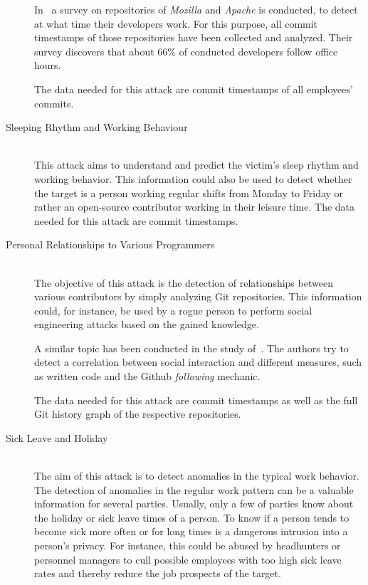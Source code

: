 \begin{description}
        In~\cite{article:do-programmers-work-at-night} a survey on repositories of \emph{Mozilla} and \emph{Apache} is conducted, to detect at what time their developers work.
        For this purpose, all commit timestamps of those repositories have been collected and analyzed.
        Their survey discovers that about 66\% of conducted developers follow office hours.

        The data needed for this attack are commit timestamps of all employees' commits.

    \item[Sleeping Rhythm and Working Behaviour] \hfill \\
        This attack aims to understand and predict the victim's sleep rhythm and working behavior.
        This information could also be used to detect whether the target is a person working regular shifts from Monday to Friday or rather an open-source contributor working in their leisure time.
        The data needed for this attack are commit timestamps.

    \item[Personal Relationships to Various Programmers] \hfill \\
        The objective of this attack is the detection of relationships between various contributors by simply analyzing Git repositories.
        This information could, for instance, be used by a rogue person to perform social engineering attacks based on the gained knowledge.

        A similar topic has been conducted in the study of~\cite{inproceedings:exploring-the-ecosystem}.
        The authors try to detect a correlation between social interaction and different measures, such as written code and the Github \emph{following} mechanic.

        The data needed for this attack are commit timestamps as well as the full Git history graph of the respective repositories.

    \item[Sick Leave and Holiday] \hfill \\
        The aim of this attack is to detect anomalies in the typical work behavior.
        The detection of anomalies in the regular work pattern can be a valuable information for several parties.
        Usually, only a few of parties know about the holiday or sick leave times of a person.
        To know if a person tends to become sick more often or for long times is a dangerous intrusion into a person's privacy.
        For instance, this could be abused by headhunters or personnel managers to cull possible employees with too high sick leave rates and thereby reduce the job prospects of the target.


\end{description}
